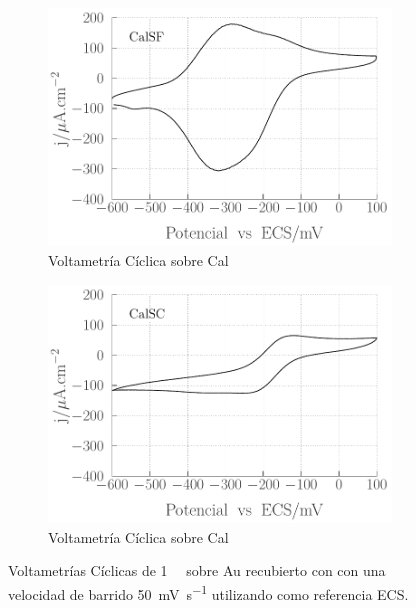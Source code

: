						\begin{figure}[th]
				 	   	    \begin{subfigure}[t]{0.495\textwidth}
				        	\includegraphics[width=\textwidth]{Graficos/SF-accesibilidad.pdf}
				       		\caption{Voltametría Cíclica sobre Cal\pdmF}
				         	\end{subfigure}
				         	\begin{subfigure}[t]{0.495\textwidth}
				        	\includegraphics[width=\textwidth]{Graficos/SC-accesibilidad.pdf}
				       		\caption{Voltametría Cíclica sobre Cal\pdmC}
				         	\end{subfigure}
				     		\caption[Accesibilidad electrodo de trabajo.]{Voltametrías Cíclicas de \aminorutenio\space \SI{1}{\milli\Molar} sobre Au recubierto con \pdm\space con una velocidad de barrido \SI{50}{\milli\volt\per\second} utilizando como referencia ECS.}
				     		\label{fig:accesibilidad}
				     		\end{figure}
	
